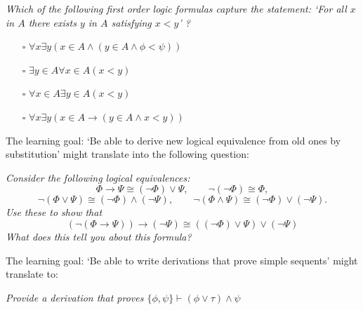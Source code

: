 \documentclass{article}[12pt]
\begin{document}
\emph{Which of the following first order logic formulas capture the statement: `For all $x$ in $A$ there exists $y$ in $A$ satisfying $x < y$' ?}
\begin{itemize}
    \item[$\square$] $ \forall x \exists y ( x \in A \wedge (y \in A \wedge \phi < \psi)) $
    \item[$\square$] $ \exists y \in A \forall x \in A (x < y) $ 
    \item[$\square$] $ \forall x \in A \exists y \in A (x < y) $
    \item[$\square$] $ \forall x \exists y (x \in A \rightarrow (y \in A \wedge x < y)) $
\end{itemize}

The learning goal: `Be able to derive new logical equivalence from old ones by substitution' might translate into the following question:

\emph{Consider the following logical equivalences: 
$$\Phi \rightarrow \Psi \cong (\neg \Phi) \vee \Psi, \qquad
 \neg (\neg \Phi) \cong \Phi,  $$
 $$\neg (\Phi \vee \Psi) \cong (\neg \Phi) \wedge (\neg \Psi), \qquad \neg (\Phi \wedge \Psi) \cong (\neg \Phi) \vee (\neg \Psi).$$ 
 Use these to show that
$$ (\neg (\Phi \rightarrow \Psi)) \rightarrow (\neg \Psi) \cong ((\neg \Phi) \vee \Psi) \vee (\neg \Psi) $$ 
What does this tell you about this formula?
}

The learning goal: `Be able to write derivations that prove simple sequents' might translate to:

\emph{Provide a derivation that proves $\{ \phi, \psi \} \vdash (\phi \vee \tau) \wedge \psi$}
\end{document}
